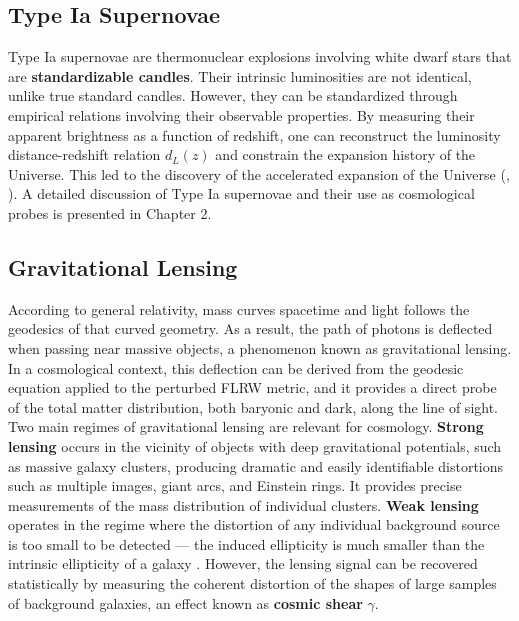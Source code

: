 \subsection{Type Ia Supernovae}

Type Ia supernovae are thermonuclear explosions involving white dwarf stars that 
are \textbf{standardizable candles}. 
Their intrinsic luminosities are not identical, unlike true standard candles. 
However, they can be standardized through empirical relations involving their observable properties. 
By measuring their apparent brightness as a function of redshift, 
one can reconstruct the luminosity distance-redshift relation $d_L(z)$ and constrain the expansion history of the Universe. 
This led to the discovery of the accelerated expansion of the Universe (\cite{Riess_1998}, \cite{Perlmutter_1999}). A detailed discussion of Type Ia 
supernovae and their use as cosmological probes is presented in Chapter 2. \\

\subsection{Gravitational Lensing}

According to general relativity, mass curves spacetime and light follows the geodesics of that curved geometry. As a result, the path of photons is deflected 
when passing near massive objects, a phenomenon known as gravitational lensing. In a cosmological context, this deflection can be derived from the geodesic equation 
applied to the perturbed FLRW metric, and it provides a direct probe of the total matter distribution, both baryonic and dark, along the line of sight. \\

Two main regimes of gravitational lensing are relevant for cosmology. \textbf{Strong lensing} occurs in the vicinity of objects with deep gravitational potentials, such 
as massive galaxy clusters, producing dramatic and easily identifiable distortions such as multiple images, giant arcs, and Einstein rings. It provides precise 
measurements of the mass distribution of individual clusters. \textbf{Weak lensing} operates in the regime where the distortion of any individual background source is 
too small to be detected — the induced ellipticity is much smaller than the intrinsic ellipticity of a galaxy \cite{Bartelmann_2001}. However, the lensing signal can be recovered statistically 
by measuring the coherent distortion of the shapes of large samples of background galaxies, an effect known as \textbf{cosmic shear} $\gamma$. \\

